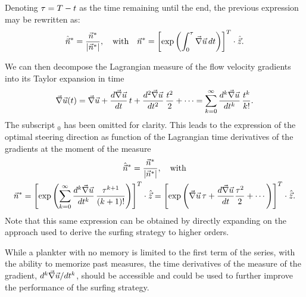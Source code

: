 Denoting $\tau = T - t$ as the time remaining until the end, the previous expression may be rewritten as:
\begin{equation}
	\label{eq:zermelo_optimal_swimming_direction}
	\hat{\vec{n}}^* = \frac{\vec{n}^*}{\lvert\vec{n}^*\rvert}, \quad \text{with} \quad \vec{n}^* = \left[ \exp \left( \int_0^\tau \vec{\nabla} \vec{u} \, dt \right) \right]^T \cdot \hat{\vec{z}}.
\end{equation}

We can then decompose the Lagrangian measure of the flow velocity gradients into its Taylor expansion in time
\begin{equation}
	\label{eq:zermelo_optimal_swimming_direction}
	\vec{\nabla} \vec{u}(t) = \vec{\nabla} \vec{u} + \frac{d \vec{\nabla} \vec{u}}{dt} \, t + \frac{d^2 \vec{\nabla} \vec{u}}{dt^2} \, \frac{t^2}{2} + \cdots = \sum_{k=0}^\infty \frac{d^k \vec{\nabla} \vec{u}}{dt^k} \, \frac{t^k}{k!}.
\end{equation}
The subscript $_0$ has been omitted for clarity.
This leads to the expression of the optimal steering direction as function of the Lagrangian time derivatives of the gradients at the moment of the measure
\begin{multline}
	\label{eq:zermelo_analytic_optimal_swimming_direction}
	\hat{\vec{n}}^* = \frac{\vec{n}^*}{\lvert\vec{n}^*\rvert}, \quad \text{with} \\ \vec{n}^* 
	= \left[ \exp \left( \sum_{k=0}^\infty  \frac{d^k \vec{\nabla} \vec{u}}{dt^k} \, \frac{\tau^{k+1}}{(k+1)!} \right) \right]^T \cdot \hat{\vec{z}} 
	= \left[ \exp \left( \vec{\nabla} \vec{u} \, \tau + \frac{d \vec{\nabla} \vec{u}}{dt} \frac{\tau^2}{2} + \cdots \right) \right]^T \cdot \hat{\vec{z}}.
\end{multline}
Note that this same expression can be obtained by directly expanding on the approach used to derive the surfing strategy to higher orders.

While a plankter with no memory is limited to the first term of the series, with the ability to memorize past measures, the time derivatives of the measure of the gradient, $d^k \vec{\nabla} \vec{u} / dt^k$, should be accessible and could be used to further improve the performance of the surfing strategy.

